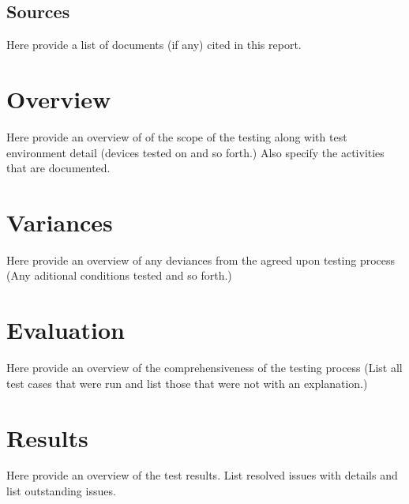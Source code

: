 \documentclass[12pt,a4paper]{article}
\begin{document}
        \subsection{Sources}
            Here provide a list of documents (if any) cited in this report.

    \section{Overview}
       	Here provide an overview of of the scope of the testing along with test environment detail (devices tested on and so forth.)
        Also specify the activities that are documented.

    \section{Variances}
        Here provide an overview of any deviances from the agreed upon testing process (Any aditional conditions tested and so forth.)

    \section{Evaluation}
        Here provide an overview of the comprehensiveness of the testing process (List all test cases that were run and list those that were not with an explanation.)

    \section{Results}
        Here provide an overview of the test results. List resolved issues with details and list outstanding issues.
\end{document}
